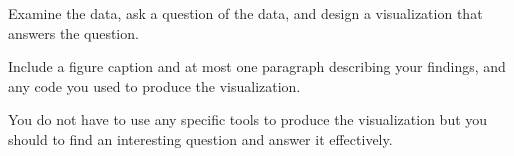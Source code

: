\documentclass[]{book}
\theoremstyle{definition}
\newtheorem*{soln}{Solution}
\begin{document}
\begin{enumerate}
Examine the data, ask a question of the data, and design a visualization that answers the question.

Include a figure caption and at most one paragraph describing your findings, and any code you used to produce the visualization.

You do not have to use any specific tools to produce the visualization but you should to find an interesting question and answer it effectively.



\end{enumerate}
\end{document}

